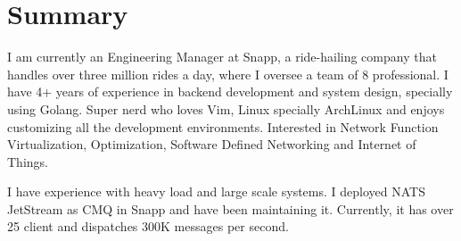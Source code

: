 \section{Summary}\closesection{}

I am currently an Engineering Manager at Snapp, a ride-hailing company that handles over three million rides a day,
where I oversee a team of 8 professional.
I have 4+ years of experience in backend development and system design,
specially using Golang.
Super nerd who loves Vim, Linux specially ArchLinux and enjoys customizing all the development environments.
Interested in Network Function Virtualization, Optimization, Software Defined Networking and Internet of Things.

I have experience with heavy load and large scale systems. I deployed NATS JetStream as CMQ in Snapp and
have been maintaining it. Currently, it has over 25 client and dispatches 300K messages per second.
